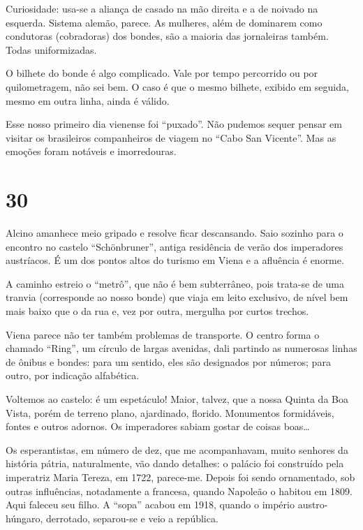 Curiosidade: usa-se a aliança de casado na mão direita e a de noivado na esquerda. Sistema alemão, parece. As mulheres, além de dominarem como condutoras (cobradoras) dos bondes, são a maioria das jornaleiras também. Todas uniformizadas.

O bilhete do bonde é algo complicado. Vale por tempo percorrido ou por quilometragem, não sei bem. O caso é que o mesmo bilhete, exibido em seguida, mesmo em outra linha, ainda é válido.

Esse nosso primeiro dia vienense foi ``puxado''. Não pudemos sequer pensar em visitar os brasileiros companheiros de viagem no ``Cabo San Vicente''. Mas as emoções foram notáveis e imorredouras.

\section*{30 \adfflatleafright {}}
Alcino amanhece meio gripado e resolve ficar descansando. Saio sozinho para o encontro no castelo ``Schönbruner'', antiga residência de verão dos imperadores austríacos. É um dos pontos altos do turismo em Viena e a afluência é enorme.

A caminho estreio o ``metrô'', que não é bem subterrâneo, pois trata-se de uma tranvia (corresponde ao nosso bonde) que viaja em leito exclusivo, de nível bem mais baixo que o da rua e, vez por outra, mergulha por curtos trechos.

Viena parece não ter também problemas de transporte. O centro forma o chamado ``Ring'', um círculo de largas avenidas, dali partindo as numerosas linhas de ônibus e bondes: para um sentido, eles são designados por números; para outro, por indicação alfabética.

Voltemos ao castelo: é um espetáculo! Maior, talvez, que a nossa Quinta da Boa Vista, porém de terreno plano, ajardinado, florido. Monumentos formidáveis, fontes e outros adornos. Os imperadores sabiam gostar de coisas boas\ldots

Os esperantistas, em número de dez, que me acompanhavam, muito senhores da história pátria, naturalmente, vão dando detalhes: o palácio foi construído pela imperatriz Maria Tereza, em 1722, parece-me. Depois foi sendo ornamentado, sob outras influências, notadamente a francesa, quando Napoleão o habitou em 1809. Aqui faleceu seu filho. A ``sopa'' acabou em 1918, quando o império austro-húngaro, derrotado, separou-se e veio a república.

